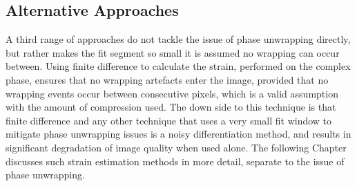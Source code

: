 \subsection{Alternative Approaches}
A third range of approaches do not tackle the issue of phase unwrapping directly, but rather makes the fit segment so small it is assumed no wrapping can occur between. Using finite difference to calculate the strain, performed on the complex phase, ensures that no wrapping artefacts enter the image, provided that no wrapping events occur between consecutive pixels, which is a valid assumption with the amount of compression used. The down side to this technique is that finite difference and any other technique that uses a very small fit window to mitigate phase unwrapping issues is a noisy differentiation method, and results in significant degradation of image quality when used alone. The following Chapter discusses such strain estimation methods in more detail, separate to the issue of phase unwrapping.
